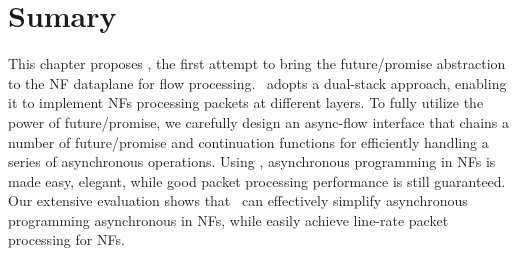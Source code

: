 \section{Sumary}

This chapter proposes \netstar, the first attempt to bring the future/promise abstraction to the NF dataplane for flow processing.  \netstar~adopts a dual-stack approach, enabling it to implement NFs processing packets at different layers. To fully utilize the power of future/promise, we carefully design an async-flow interface that chains a number of future/promise and continuation functions for efficiently handling a series of asynchronous operations. Using \netstar, asynchronous programming in NFs is made easy, elegant, while good packet processing performance is still guaranteed. Our extensive evaluation shows that \netstar~can effectively simplify asynchronous programming asynchronous in NFs, while easily achieve line-rate packet processing for NFs.
